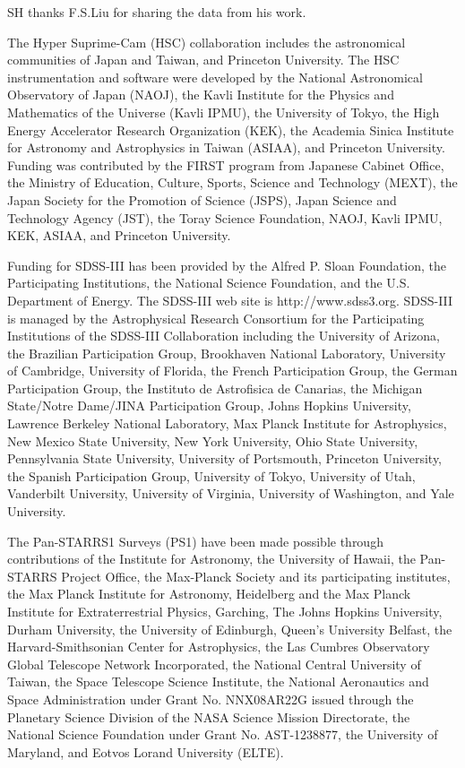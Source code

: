 \documentclass{emulateapj}
\begin{document}
\begin{CJK*}{UTF8}{gbsn}
\acknowledgements

  SH thanks F.S.Liu for sharing the data from his work.

  The Hyper Suprime-Cam (HSC) collaboration includes the astronomical communities of 
  Japan and Taiwan, and Princeton University.  The HSC instrumentation and software were
  developed by the National Astronomical Observatory of Japan (NAOJ), the Kavli Institute
  for the Physics and Mathematics of the Universe (Kavli IPMU), the University of Tokyo,
  the High Energy Accelerator Research Organization (KEK), the Academia Sinica Institute
  for Astronomy and Astrophysics in Taiwan (ASIAA), and Princeton University.  
  Funding was contributed by the FIRST program from Japanese Cabinet Office, the Ministry 
  of Education, Culture, Sports, Science and Technology (MEXT), the Japan Society for 
  the Promotion of Science (JSPS), Japan Science and Technology Agency (JST), the
  Toray Science Foundation, NAOJ, Kavli IPMU, KEK, ASIAA, and Princeton University.
   
  Funding for SDSS-III has been provided by the Alfred P. Sloan Foundation, the
  Participating Institutions, the National Science Foundation, and the U.S.  Department of
  Energy. The SDSS-III web site is http://www.sdss3.org.  SDSS-III is managed by the
  Astrophysical Research Consortium for the Participating Institutions of the SDSS-III
  Collaboration including the University of Arizona, the Brazilian Participation Group,
  Brookhaven National Laboratory, University of Cambridge, University of Florida, the
  French Participation Group, the German Participation Group, the Instituto de Astrofisica
  de Canarias, the Michigan State/Notre Dame/JINA Participation Group, Johns Hopkins
  University, Lawrence Berkeley National Laboratory, Max Planck Institute for
  Astrophysics, New Mexico State University, New York University, Ohio State University,
  Pennsylvania State University, University of Portsmouth, Princeton University, the
  Spanish Participation Group, University of Tokyo, University of Utah, Vanderbilt
  University, University of Virginia, University of Washington, and Yale University.
  
  The Pan-STARRS1 Surveys (PS1) have been made possible through contributions of the 
  Institute for Astronomy, the University of Hawaii, the Pan-STARRS Project Office, 
  the Max-Planck Society and its participating institutes, the Max Planck Institute 
  for Astronomy, Heidelberg and the Max Planck Institute for Extraterrestrial Physics, 
  Garching, The Johns Hopkins University, Durham University, the University of Edinburgh, 
  Queen's University Belfast, the Harvard-Smithsonian Center for Astrophysics, the Las 
  Cumbres Observatory Global Telescope Network Incorporated, the National Central 
  University of Taiwan, the Space Telescope Science Institute, the National Aeronautics 
  and Space Administration under Grant No. NNX08AR22G issued through the Planetary 
  Science Division of the NASA Science Mission Directorate, the National Science 
  Foundation under Grant No. AST-1238877, the University of Maryland, and Eotvos 
  Lorand University (ELTE).
  

\end{CJK*}
\end{document}
